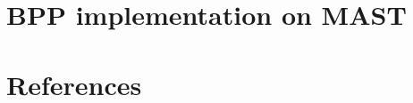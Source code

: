 \documentclass[11pt]{iopart}
\begin{document}
\section{BPP implementation on MAST}  



\section{References}


\end{document}
